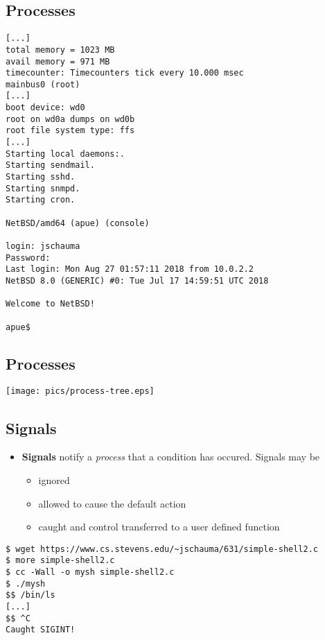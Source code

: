 \documentclass[sxga]{xdvislides}
\begin{document}
\subsection{Processes}
\small
\begin{verbatim}
[...]
total memory = 1023 MB
avail memory = 971 MB
timecounter: Timecounters tick every 10.000 msec
mainbus0 (root)
[...]
boot device: wd0
root on wd0a dumps on wd0b
root file system type: ffs
[...]
Starting local daemons:.
Starting sendmail.
Starting sshd.
Starting snmpd.
Starting cron.

NetBSD/amd64 (apue) (console)

login: jschauma
Password:
Last login: Mon Aug 27 01:57:11 2018 from 10.0.2.2
NetBSD 8.0 (GENERIC) #0: Tue Jul 17 14:59:51 UTC 2018

Welcome to NetBSD!

apue$
\end{verbatim}
\Normalsize



\subsection{Processes}
\begin{center}
\texttt{[image: pics/process-tree.eps]} \\
\end{center}

\subsection{Signals}
\begin{itemize}
	\item	{\bf Signals} notify a {\em process} that a condition
			has occured. Signals may be
		\begin{itemize}
			\item ignored
			\item allowed to cause the default action
			\item caught and control transferred to a user defined function
		\end{itemize}
\end{itemize}
\vspace*{\fill}
\begin{center}
\begin{verbatim}
$ wget https://www.cs.stevens.edu/~jschauma/631/simple-shell2.c
$ more simple-shell2.c
$ cc -Wall -o mysh simple-shell2.c
$ ./mysh
$$ /bin/ls
[...]
$$ ^C
Caught SIGINT!
\end{verbatim}
\end{center}
\vspace*{\fill}
\end{document}
